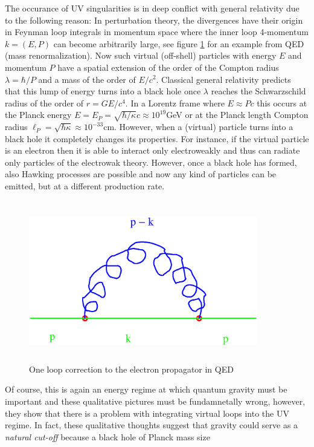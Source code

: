 \documentclass[12pt]{report}
\begin{document}
\begin{itemize}
The occurance of UV singularities is in deep conflict with general
relativity due to the following reason: In perturbation theory, the 
divergences have their origin in Feynman loop integrals in momentum space
where the inner loop 4-momentum $k=(E,P)$ can become arbitrarily large,
see figure \ref{f1} for an example from QED (mass renormalization). Now 
such virtual (off-shell) particles with energy $E$ and momentum $P$
have a spatial extension of the order of the Compton radius 
$\lambda=\hbar/P$
and a mass of the order of $E/c^2$. Classical general relativity 
predicts that this lump of energy turns into a black hole once  
$\lambda$ reaches the Schwarzschild radius of the order of $r=G E/c^4$. In 
a Lorentz frame where $E\approx Pc$ this occurs at the Planck energy
$E=E_P=\sqrt{\hbar/\kappa}c\approx 10^{19}$GeV or at the Planck length 
Compton radius $\ell_P=\sqrt{\hbar\kappa}\approx 10^{-33}$cm. 
However, when a (virtual) particle turns into a black hole it completely
changes its properties. For instance, if the virtual particle is an 
electron then it is able to interact only 
electroweakly and thus can radiate only particles of the electrowak 
theory. However, once a black hole has formed, also Hawking processes
are possible and now any kind of particles can be emitted, but at a 
different production rate. 
%
\begin{figure}
\includegraphics[width=10cm,height=7cm]{proc9fig1.ps}
\caption{One loop correction to the electron propagator in QED}
\label{f1}
\end{figure}
%
Of course, this is again an energy regime at 
which quantum gravity must be important and these qualitative pictures 
must be fundamnetally wrong, however, they show that there is a problem
with integrating virtual loops into the UV regime.
In fact, these qualitative thoughts suggest that gravity could serve 
as a {\it natural cut-off} because a black hole of Planck mass size

\end{itemize}
\end{document}
